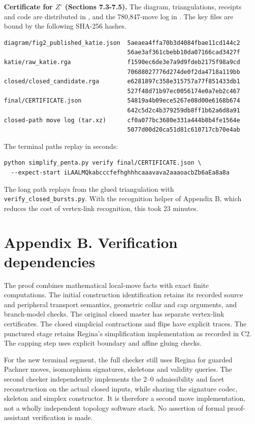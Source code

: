 \documentclass[11pt,letterpaper]{article}
\begin{document}
\smallskip\textbf{Certificate for $Z^\circ$ (Sections 7.3-7.5).} The diagram, triangulations, receipts and code are distributed in , and the 780,847-move log in . The key files are bound by the following SHA-256 hashes.
\begin{Verbatim}
diagram/fig2_published_katie.json  5aeaea4ffa70b3d4084fbae11cd144c2
                                   56ae3af361cbebb10da07166cad3427f
katie/raw_katie.rga                f1590ec6de3e7a9d9fdeb2175f98a9cd
                                   70688027776d274de0f2da4718a119bb
closed/closed_candidate.rga        e6281897c358e315757a77f851433db1
                                   527f48d71b97ec0056174e0a7eb2c467
final/CERTIFICATE.json             54819a4b09ece5267e08d00e6168b674
                                   642c5d2c4b379259db8ff1b62a6d8a91
closed-path move log (tar.xz)      cf0a077bc3680e331a444b8b4fe1564e
                                   5077d00d20ca51d81c610717cb70e4ab
\end{Verbatim}
The terminal paths replay in seconds:
\begin{Verbatim}
python simplify_penta.py verify final/CERTIFICATE.json \
  --expect-start iLAALMQkabcccfefhghhhcaaavava2aaaoacbZb6aEa8a8a
\end{Verbatim}
The long path replays from the glued triangulation with \texttt{verify\_closed\_bursts.py}. With the recognition helper of Appendix B, which reduces the cost of vertex-link recognition, this took 23 minutes.

\section*{Appendix B. Verification dependencies}
The proof combines mathematical local-move facts with exact finite computations. The initial construction identification retains its recorded source and peripheral transport semantics, geometric collar and cap arguments, and branch-model checks. The original closed master has separate vertex-link certificates. The closed simplicial contractions and flips have explicit traces. The punctured stage retains Regina's simplification implementation as recorded in C2. The capping step uses explicit boundary and affine gluing checks.

For the new terminal segment, the full checker still uses Regina for guarded Pachner moves, isomorphism signatures, skeletons and validity queries. The second checker independently implements the 2--0 admissibility and facet reconstruction on the actual closed inputs, while sharing the signature codec, skeleton and simplex constructor. It is therefore a second move implementation, not a wholly independent topology software stack. No assertion of formal proof-assistant verification is made.
\end{document}
